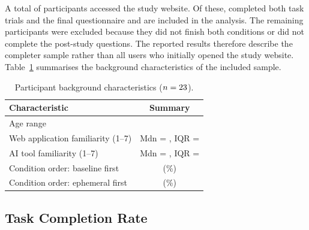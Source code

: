 A total of \GenNTotal{} participants accessed the study website. Of these, \GenNValid{} completed both task trials and the final questionnaire and are included in the analysis. The remaining participants were excluded because they did not finish both conditions or did not complete the post-study questions. The reported results therefore describe the completer sample rather than all users who initially opened the study website. Table~\ref{tab:demographics} summarises the background characteristics of the included sample.

\begin{table}[htbp]
    \centering
    \caption{Participant background characteristics ($n = 23$).}
    \label{tab:demographics}
    \begin{tabular}{@{}lc@{}}
        \toprule
        Characteristic & Summary \\
        \midrule
        Age range & \GenDemoAge{} \\
        Web application familiarity (1--7) & Mdn = \GenDemoWebMdn{}, IQR = \GenDemoWebIqr{} \\
        AI tool familiarity (1--7) & Mdn = \GenDemoAiMdn{}, IQR = \GenDemoAiIqr{} \\
        Condition order: baseline first & \GenCounterBaselineFirstN{} (\GenCounterBaselineFirstPct{}\%) \\
        Condition order: ephemeral first & \GenCounterEphemeralFirstN{} (\GenCounterEphemeralFirstPct{}\%) \\
        \bottomrule
    \end{tabular}
\end{table}

\subsection{Task Completion Rate}

%


